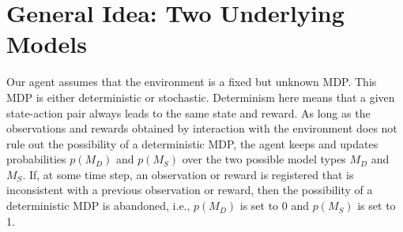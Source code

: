 \documentclass{scrartcl}
\begin{document}

\section{General Idea: Two Underlying Models}
Our agent assumes that the environment is a fixed but unknown MDP. This MDP is either deterministic or stochastic. Determinism here means that a given state-action pair always leads to the same state and reward. As long as the observations and rewards obtained by interaction with the environment does not rule out the possibility of a deterministic MDP, the agent keeps and updates probabilities $p(M_D)$ and $p(M_S)$ over the two possible model types $M_D$ and $M_S$. If, at some time step, an observation or reward is registered that is inconsistent with a previous observation or reward, then the possibility of a deterministic MDP is abandoned, i.e., $p(M_D)$ is set to 0 and $p(M_S)$ is set to 1.
\end{document}
